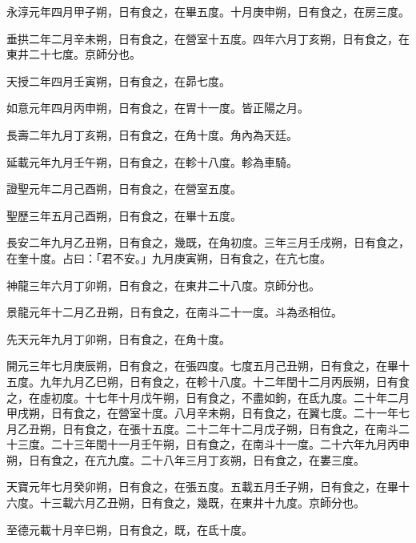 \begin{pinyinscope}
 永淳元年四月甲子朔，日有食之，在畢五度。十月庚申朔，日有食之，在房三度。



 垂拱二年二月辛未朔，日有食之，在營室十五度。四年六月丁亥朔，日有食之，在東井二十七度。京師分也。



 天授二年四月壬寅朔，日有食之，在昴七度。



 如意元年四月丙申朔，日有食之，在胃十一度。皆正陽之月。



 長壽二年九月丁亥朔，日有食之，在角十度。角內為天廷。



 延載元年九月壬午朔，日有食之，在軫十八度。軫為車騎。



 證聖元年二月己酉朔，日有食之，在營室五度。



 聖歷三年五月己酉朔，日有食之，在畢十五度。



 長安二年九月乙丑朔，日有食之，幾既，在角初度。三年三月壬戌朔，日有食之，在奎十度。占曰：「君不安。」九月庚寅朔，日有食之，在亢七度。



 神龍三年六月丁卯朔，日有食之，在東井二十八度。京師分也。



 景龍元年十二月乙丑朔，日有食之，在南斗二十一度。斗為丞相位。



 先天元年九月丁卯朔，日有食之，在角十度。



 開元三年七月庚辰朔，日有食之，在張四度。七度五月己丑朔，日有食之，在畢十五度。九年九月乙巳朔，日有食之，在軫十八度。十二年閏十二月丙辰朔，日有食之，在虛初度。十七年十月戊午朔，日有食之，不盡如鉤，在氐九度。二十年二月甲戌朔，日有食之，在營室十度。八月辛未朔，日有食之，在翼七度。二十一年七月乙丑朔，日有食之，在張十五度。二十二年十二月戊子朔，日有食之，在南斗二十三度。二十三年閏十一月壬午朔，日有食之，在南斗十一度。二十六年九月丙申朔，日有食之，在亢九度。二十八年三月丁亥朔，日有食之，在婁三度。



 天寶元年七月癸卯朔，日有食之，在張五度。五載五月壬子朔，日有食之，在畢十六度。十三載六月乙丑朔，日有食之，幾既，在東井十九度。京師分也。



 至德元載十月辛巳朔，日有食之，既，在氐十度。




\end{pinyinscope}
